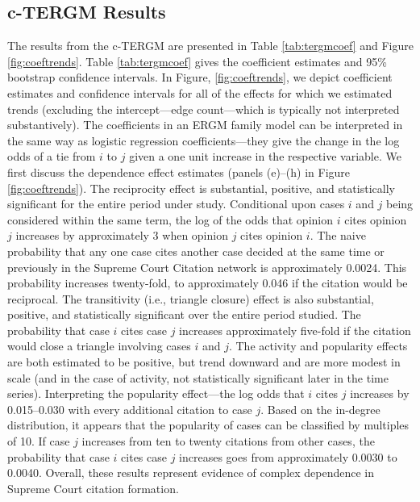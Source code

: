 \documentclass[headsepline=true, abstracton]{scrartcl}
\begin{document}
\subsection{c-TERGM Results}
The results from the c-TERGM are presented in Table \ref{tab:tergmcoef} and Figure \ref{fig:coeftrends}. Table \ref{tab:tergmcoef} gives the coefficient estimates and 95\% bootstrap confidence intervals. In Figure, \ref{fig:coeftrends}, we depict coefficient estimates and confidence intervals for all of the effects for which we estimated trends (excluding the intercept---edge count---which is typically not interpreted substantively). The coefficients in an ERGM family model can be interpreted in the same way as logistic regression coefficients---they give the change in the log odds of a tie from $i$ to $j$ given a one unit increase in the respective variable. We first discuss the dependence effect estimates (panels (e)--(h) in Figure \ref{fig:coeftrends}). The reciprocity effect is substantial, positive, and statistically significant for the entire period under study. Conditional upon cases $i$ and $j$ being considered within the same term, the log of the odds that opinion $i$ cites opinion $j$ increases by approximately 3 when opinion $j$ cites opinion $i$. The naive probability that any one case cites another case decided at the same time or previously in the Supreme Court Citation network is approximately 0.0024. This probability increases twenty-fold, to approximately 0.046 if the citation would be reciprocal. The transitivity (i.e., triangle closure) effect is also substantial, positive, and statistically significant over the entire period studied. The probability that case $i$ cites case $j$ increases approximately five-fold if the citation would close a triangle involving cases $i$ and $j$. The activity and popularity effects are both estimated to be positive, but trend downward and are more modest in scale (and in the case of activity, not statistically significant later in the time series). Interpreting the popularity effect---the log odds that $i$ cites $j$ increases by 0.015--0.030 with every additional citation to case $j$. Based on the in-degree distribution, it appears that the popularity of cases can be classified by multiples of 10. If case $j$ increases from ten to twenty citations from other cases, the probability that case $i$ cites case $j$ increases goes from approximately 0.0030 to 0.0040. Overall, these results represent evidence of complex dependence in Supreme Court citation formation.
\end{document}
